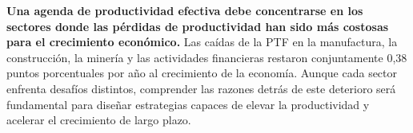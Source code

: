 



\textbf{Una agenda de productividad efectiva debe concentrarse en los sectores donde las pérdidas de productividad han sido más costosas para el crecimiento económico.} Las caídas de la PTF en la manufactura, la construcción, la minería y las actividades financieras restaron conjuntamente 0,38 puntos porcentuales por año al crecimiento de la economía. Aunque cada sector enfrenta desafíos distintos, comprender las razones detrás de este deterioro será fundamental para diseñar estrategias capaces de elevar la productividad y acelerar el crecimiento de largo plazo.

